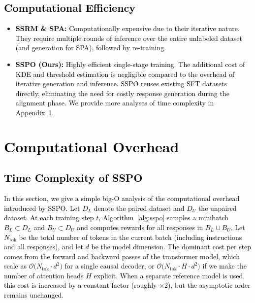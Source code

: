 \documentclass{article} %
\newcommand\rebuttal[1]{\textcolor{black}{#1}}
\begin{document}
\subsection{\rebuttal{Computational Efficiency}}
\begin{itemize}
    \item \rebuttal{\textbf{SSRM \& SPA:} Computationally expensive due to their iterative nature. They require multiple rounds of inference over the entire unlabeled dataset (and generation for SPA), followed by re-training.}
    \item \rebuttal{\textbf{SSPO (Ours):} Highly efficient single-stage training. The additional cost of KDE and threshold estimation is negligible compared to the overhead of iterative generation and inference. SSPO reuses existing SFT datasets directly, eliminating the need for costly response generation during the alignment phase. We provide more analyses of time complexity in Appendix~\ref{appendix:computational_overhead}.}
\end{itemize}



\section{\rebuttal{Computational Overhead}}
\label{appendix:computational_overhead}

\subsection{\rebuttal{Time Complexity of SSPO}}
\label{appendix:sspo_complexity}

\rebuttal{In this section, we give a simple big-O analysis of the computational overhead introduced by SSPO. Let $D_L$ denote the paired dataset and $D_U$ the unpaired dataset. At each training step $t$, Algorithm~\ref{alg:sspo} samples a minibatch $B_L \subset D_L$ and $B_U \subset D_U$ and computes rewards for all responses in $B_L \cup B_U$. Let $N_{\text{tok}}$ be the total number of tokens in the current batch (including instructions and all responses), and let $d$ be the model dimension. The dominant cost per step comes from the forward and backward passes of the transformer model, which scale as $\mathcal{O}\big(N_{\text{tok}} \cdot d^2\big)$ for a single causal decoder, or $\mathcal{O}\big(N_{\text{tok}} \cdot H \cdot d^2\big)$ if we make the number of attention heads $H$ explicit. When a separate reference model is used, this cost is increased by a constant factor (roughly $\times 2$), but the asymptotic order remains unchanged.}
\end{document}
